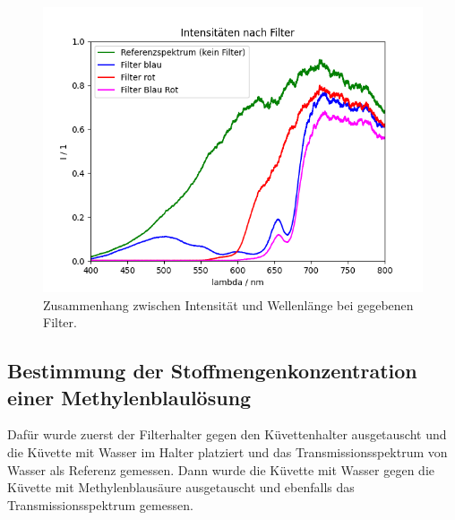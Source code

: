 \documentclass{article}
\begin{document}
\begin{figure}[H]
\centering
\caption{Zusammenhang zwischen Intensität und Wellenlänge bei gegebenen Filter.}
\label{fig:I_Methyl}
\includegraphics[scale=0.7]{Intensitaeten.png}
\end{figure}





\subsection{Bestimmung der Stoffmengenkonzentration einer Methylenblaulösung}

Dafür wurde zuerst der Filterhalter gegen den Küvettenhalter ausgetauscht und die Küvette mit Wasser im Halter platziert und das Transmissionsspektrum von Wasser als Referenz gemessen. Dann wurde die Küvette mit Wasser gegen die Küvette mit Methylenblausäure ausgetauscht und ebenfalls das Transmissionsspektrum gemessen.
\end{document}
